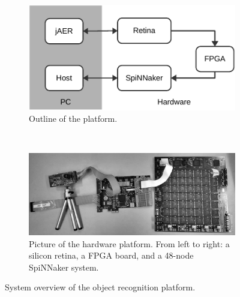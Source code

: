 \documentclass[journal]{journal}
\begin{document}
\begin{figure}[h!]
\centering
	\begin{subfigure}[t]{0.48\textwidth}
		\includegraphics[width=\textwidth]{pics/outline.pdf}
	    \caption{Outline of the platform.}
	    \label{fig:SysOverViewa}
	\end{subfigure}
	\\
	\begin{subfigure}[t]{0.48\textwidth}
		\includegraphics[width=\textwidth]{pics/outline2.pdf}	    \caption{Picture of the hardware platform. From left to right: a silicon retina, a FPGA board, and a 48-node SpiNNaker system.}
	    \label{fig:SysOverViewb}
	\end{subfigure}	

\caption{System overview of the object recognition platform. 
}
\label{fig:SysOverView}
\end{figure}
\end{document}
